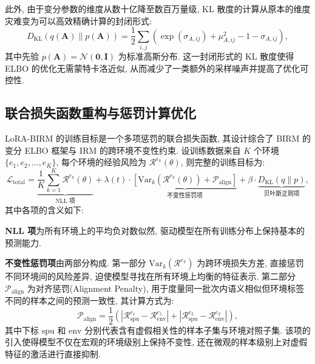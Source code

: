 \documentclass[a4paper,punct=banjiao,twoside]{ctexrep}
\theoremstyle{plain}
\theoremstyle{definition}
\theoremstyle{remark}
\begin{document}
此外, 由于变分参数的维度从数十亿降至数百万量级, KL 散度的计算从原本的维度灾难变为可以高效精确计算的封闭形式:
\begin{equation}
    D_{\text{KL}}\!\left(q(\mathbf{A}) \| p(\mathbf{A})\right) = \frac{1}{2} \sum_{i,j} \left( \exp(\sigma_{A,ij}) + \mu_{A,ij}^2 - 1 - \sigma_{A,ij} \right),
\end{equation}
其中先验 $p(\mathbf{A}) = \mathcal{N}(\mathbf{0}, \mathbf{I})$ 为标准高斯分布. 这一封闭形式的 KL 散度使得 ELBO 的优化无需蒙特卡洛近似, 从而减少了一类额外的采样噪声并提高了优化可控性.

\subsection{联合损失函数重构与惩罚计算优化}

LoRA-BIRM 的训练目标是一个多项惩罚的联合损失函数, 其设计综合了 BIRM 的变分 ELBO 框架与 IRM 的跨环境不变性约束. 设训练数据来自 $K$ 个环境 $\{e_1, e_2, \ldots, e_K\}$, 每个环境的经验风险为 $\mathcal{R}^{e_k}(\theta)$, 则完整的训练目标为:
\begin{equation}
    \mathcal{L}_{\text{total}} = \underbrace{\frac{1}{K}\sum_{k=1}^{K} \mathcal{R}^{e_k}(\theta)}_{\text{NLL 项}} + \lambda(t) \cdot \underbrace{\left[\text{Var}_{k}\!\left(\mathcal{R}^{e_k}(\theta)\right) + \mathcal{P}_{\text{align}}\right]}_{\text{不变性惩罚项}} + \beta \cdot \underbrace{D_{\text{KL}}\!\left(q \| p\right)}_{\text{贝叶斯正则项}},
    \label{eq:lora_birm_loss}
\end{equation}
其中各项的含义如下:

\textbf{NLL 项}为所有环境上的平均负对数似然, 驱动模型在所有训练分布上保持基本的预测能力.

\textbf{不变性惩罚项}由两部分构成. 第一部分 $\text{Var}_{k}(\mathcal{R}^{e_k})$ 为跨环境损失方差, 直接惩罚不同环境间的风险差异, 迫使模型寻找在所有环境上均衡的特征表示. 第二部分 $\mathcal{P}_{\text{align}}$ 为对齐惩罚(Alignment Penalty), 用于度量同一批次内语义相似但环境标签不同的样本之间的预测一致性, 其计算方式为:
\begin{equation}
    \mathcal{P}_{\text{align}} = \frac{1}{2}\left(\left|\mathcal{R}^{e_1}_{\text{spu}} - \mathcal{R}^{e_1}_{\text{env}}\right| + \left|\mathcal{R}^{e_2}_{\text{spu}} - \mathcal{R}^{e_2}_{\text{env}}\right|\right),
\end{equation}
其中下标 $\text{spu}$ 和 $\text{env}$ 分别代表含有虚假相关性的样本子集与环境对照子集. 该项的引入使得模型不仅在宏观的环境级别上保持不变性, 还在微观的样本级别上对虚假特征的激活进行直接抑制.
\end{document}
